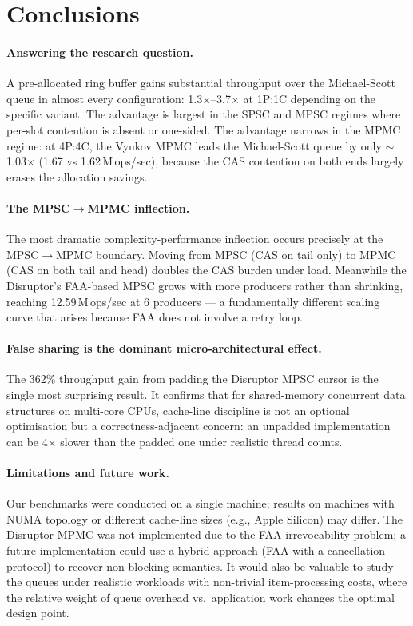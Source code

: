 \documentclass[11pt,a4paper]{article}
\begin{document}
\section{Conclusions}
\label{sec:conclusions}

\paragraph{Answering the research question.}
A pre-allocated ring buffer gains substantial throughput over the Michael-Scott queue
in almost every configuration: 1.3$\times$--3.7$\times$ at 1P:1C depending on the
specific variant. The advantage is largest in the SPSC and MPSC regimes where per-slot
contention is absent or one-sided. The advantage narrows in the MPMC regime: at 4P:4C,
the Vyukov MPMC leads the Michael-Scott queue by only $\sim$1.03$\times$ (1.67 vs
1.62\,M\,ops/sec), because the CAS contention on both ends largely erases the
allocation savings.

\paragraph{The MPSC$\to$MPMC inflection.}
The most dramatic complexity-performance inflection occurs precisely at the MPSC$\to$MPMC
boundary. Moving from MPSC (CAS on tail only) to MPMC (CAS on both tail and head) doubles
the CAS burden under load. Meanwhile the Disruptor's FAA-based MPSC grows with more producers
rather than shrinking, reaching 12.59\,M\,ops/sec at 6 producers --- a fundamentally different
scaling curve that arises because FAA does not involve a retry loop.

\paragraph{False sharing is the dominant micro-architectural effect.}
The 362\% throughput gain from padding the Disruptor MPSC cursor is the single most
surprising result. It confirms that for shared-memory concurrent data structures on
multi-core CPUs, cache-line discipline is not an optional optimisation but a
correctness-adjacent concern: an unpadded implementation can be 4$\times$ slower
than the padded one under realistic thread counts.

\paragraph{Limitations and future work.}
Our benchmarks were conducted on a single machine; results on machines with
NUMA topology or different cache-line sizes (e.g., Apple Silicon) may differ.
The Disruptor MPMC was not implemented due to the FAA irrevocability problem;
a future implementation could use a hybrid approach (FAA with a cancellation
protocol) to recover non-blocking semantics. It would also be valuable to study
the queues under realistic workloads with non-trivial item-processing costs,
where the relative weight of queue overhead vs.\ application work changes the
optimal design point.
\end{document}
